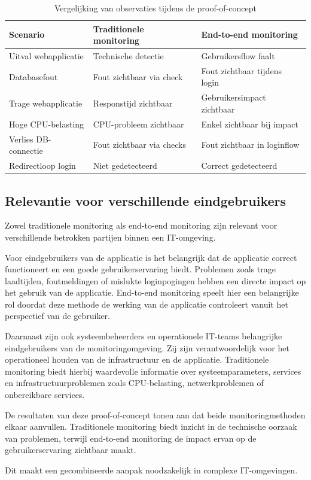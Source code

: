 \begin{table}[H]
    \centering
    \small
    \begin{tabular}{|p{4cm}|p{5cm}|p{5cm}|}
        \hline
        \textbf{Scenario} & \textbf{Traditionele monitoring} & \textbf{End-to-end monitoring} \\ \hline
        Uitval webapplicatie & Technische detectie & Gebruikersflow faalt \\ \hline
        Databasefout & Fout zichtbaar via check & Fout zichtbaar tijdens login \\ \hline
        Trage webapplicatie & Responstijd zichtbaar & Gebruikersimpact zichtbaar \\ \hline
        Hoge CPU-belasting & CPU-probleem zichtbaar & Enkel zichtbaar bij impact \\ \hline
        Verlies DB-connectie & Fout zichtbaar via checks & Fout zichtbaar in loginflow \\ \hline
        Redirectloop login & Niet gedetecteerd & Correct gedetecteerd \\ \hline
    \end{tabular}
    \caption{Vergelijking van observaties tijdens de proof-of-concept}
    \label{tab:poc_observaties}
\end{table}

\subsection{Relevantie voor verschillende eindgebruikers}

Zowel traditionele monitoring als end-to-end monitoring zijn relevant voor verschillende betrokken partijen binnen een IT-omgeving.

Voor eindgebruikers van de applicatie is het belangrijk dat de applicatie correct functioneert en een goede gebruikerservaring biedt. Problemen zoals trage laadtijden, foutmeldingen of mislukte loginpogingen hebben een directe impact op het gebruik van de applicatie. End-to-end monitoring speelt hier een belangrijke rol doordat deze methode de werking van de applicatie controleert vanuit het perspectief van de gebruiker.

Daarnaast zijn ook systeembeheerders en operationele IT-teams belangrijke eindgebruikers van de monitoringomgeving. Zij zijn verantwoordelijk voor het operationeel houden van de infrastructuur en de applicatie. Traditionele monitoring biedt hierbij waardevolle informatie over systeemparameters, services en infrastructuurproblemen zoals CPU-belasting, netwerkproblemen of onbereikbare services.

De resultaten van deze proof-of-concept tonen aan dat beide monitoringmethoden elkaar aanvullen. Traditionele monitoring biedt inzicht in de technische oorzaak van problemen, terwijl end-to-end monitoring de impact ervan op de gebruikerservaring zichtbaar maakt.

Dit maakt een gecombineerde aanpak noodzakelijk in complexe IT-omgevingen.